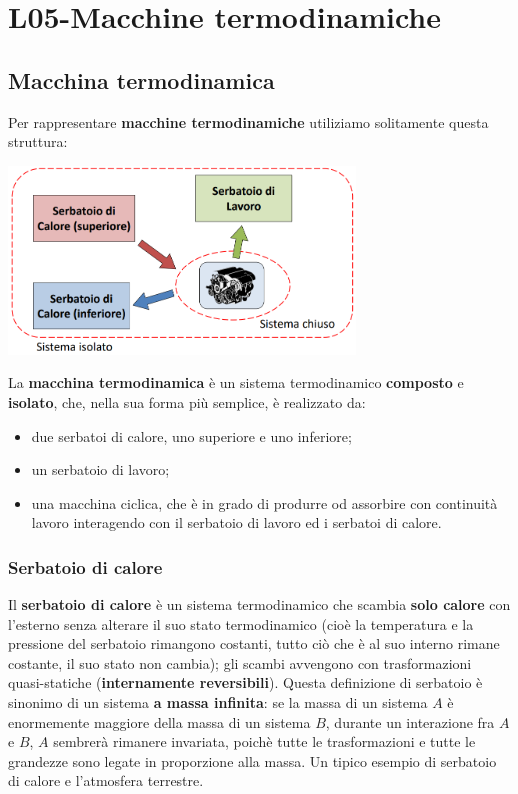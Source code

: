 \section{L05-Macchine termodinamiche}
\subsection{Macchina termodinamica}
Per rappresentare \textbf{macchine termodinamiche} utiliziamo solitamente questa struttura:
\begin{center}
    \includegraphics[height=5cm]{../L05/img1.PNG}
\end{center}
La \textbf{macchina termodinamica} è un sistema termodinamico \textbf{composto} e \textbf{isolato}, che, nella sua forma più semplice, è realizzato da:
\begin{itemize}
    \item due serbatoi di calore, uno superiore e uno inferiore;
    \item un serbatoio di lavoro;
    \item una macchina ciclica, che è in grado di produrre od assorbire con continuità lavoro interagendo con il serbatoio di lavoro ed i serbatoi di calore.
\end{itemize}
\subsubsection{Serbatoio di calore}
Il \textbf{serbatoio di calore} è un sistema termodinamico che scambia \textbf{solo calore} con l'esterno senza alterare il suo stato termodinamico (cioè la temperatura e la pressione del serbatoio rimangono costanti, tutto ciò che è al suo interno rimane costante, il suo stato non cambia); gli scambi avvengono con trasformazioni quasi-statiche (\textbf{internamente reversibili}).\newline
\newline
Questa definizione di serbatoio è sinonimo di un sistema \textbf{a massa infinita}: se la massa di un sistema $A$ è enormemente maggiore della massa di un sistema $B$, durante un interazione fra $A$ e $B$, $A$ sembrerà rimanere invariata, poichè tutte le trasformazioni e tutte le grandezze sono legate in proporzione alla massa.\newline
\newline
Un tipico esempio di serbatoio di calore e l'atmosfera terrestre.
